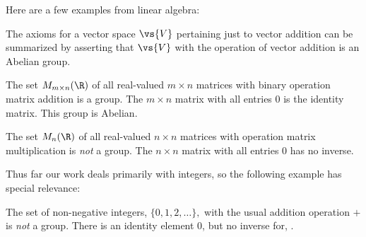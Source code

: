 Here are a few examples from linear algebra:
\begin{example}
The axioms for a vector space $\vs{V}$ pertaining just to vector addition
can be summarized by asserting that $\vs{V}$ with the operation of vector
addition is an Abelian group.
\end{example}
\begin{example}
The set $M_{m\times n}(\R)$ of all real-valued $m \times n$ matrices
with binary operation matrix addition is a group.  The $m \times n$ matrix with
all entries 0 is the identity matrix.  This group is Abelian.
\end{example}
\begin{example}
The set $M_n(\R)$ of all real-valued $n \times n$ matrices with
operation matrix multiplication is \emph{not} a group.  The $n \times
n$ matrix with all entries 0 has no inverse.
\end{example}
Thus far our work deals primarily with integers, so the
following example has special relevance:
\begin{example}
The set of non-negative integers, $\{0, 1, 2, \ldots \},$ with
the usual addition operation $+$ is \emph{not} a group.  There is an
identity element 0, but no inverse for, .
\end{example}

